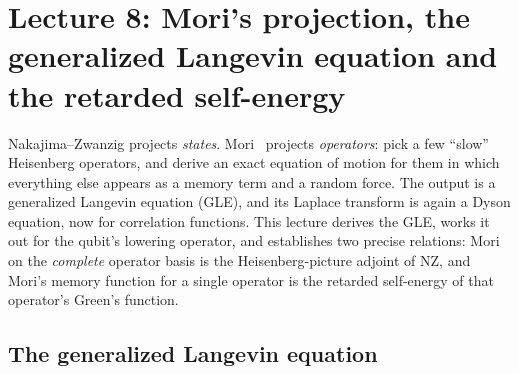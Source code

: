 \section{Lecture 8: Mori's projection, the generalized Langevin equation and the retarded self-energy}
\label{sec:lec8}

Nakajima--Zwanzig projects \emph{states}.
Mori~\cite{Mori1965} projects \emph{operators}: pick a few ``slow'' Heisenberg operators, and derive an exact equation of motion for them in which everything else appears as a memory term and a random force.
The output is a generalized Langevin equation (GLE), and its Laplace transform is again a Dyson equation, now for correlation functions.
This lecture derives the GLE, works it out for the qubit's lowering operator, and establishes two precise relations: Mori on the \emph{complete} operator basis is the Heisenberg-picture adjoint of NZ, and Mori's memory function for a single operator is the retarded self-energy of that operator's Green's function.

\subsection{The generalized Langevin equation}

